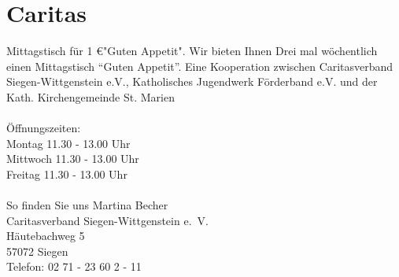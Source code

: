 \section{Caritas}
Mittagstisch für 1 \euro  "Guten Appetit". Wir bieten Ihnen Drei mal wöchentlich einen Mittagstisch \enquote{Guten Appetit}. Eine Kooperation zwischen Caritasverband Siegen-Wittgenstein e.V., Katholisches Jugendwerk Förderband e.V. und der Kath. Kirchengemeinde St. Marien\\  
\\
Öffnungszeiten:\\
Montag 11.30 - 13.00 Uhr \\
Mittwoch 11.30 - 13.00 Uhr \\
Freitag 11.30 - 13.00 Uhr \\
\\
So finden Sie uns 
Martina Becher\\
Caritasverband Siegen-Wittgenstein e.~V.\\ 
Häutebachweg 5\\
57072 Siegen \\
Telefon: 02 71 - 23 60 2 - 11 
